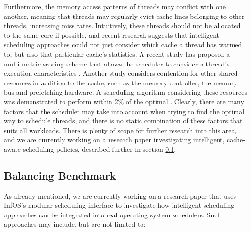 \documentclass[bsc,frontabs,singlespacing,parskip,deptreport]{infthesis}
\begin{document}
Furthermore, the memory access patterns of threads may conflict with one another, meaning that threads may regularly evict cache lines belonging to other threads, increasing miss rates. Intuitively, these threads should not be allocated to the same core if possible, and recent research suggests that intelligent scheduling approaches could not just consider which cache a thread has warmed to, but also that particular cache's statistics. A recent study has proposed a multi-metric scoring scheme that allows the scheduler to consider a thread's execution characteristics \cite{adaptive-sched}. Another study considers contention for other shared resources in addition to the cache, such as the memory controller, the memory bus and prefetching hardware. A scheduling algorithm considering these resources was demonstrated to perform within 2\% of the optimal \cite{contention-aware-sched}. Clearly, there are many factors that the scheduler may take into account when trying to find the optimal way to schedule threads, and there is no static combination of these factors that suits all workloads. There is plenty of scope for further research into this area, and we are currently working on a research paper investigating intelligent, cache-aware scheduling policies, described further in section \ref{load-balancing-policies}.



\subsection{Balancing Benchmark} \label{load-balancing-policies}
As already mentioned, we are currently working on a research paper that uses InfOS's modular scheduling interface to investigate how intelligent scheduling approaches can be integrated into real operating system schedulers. Such approaches may include, but are not limited to:
\end{document}
